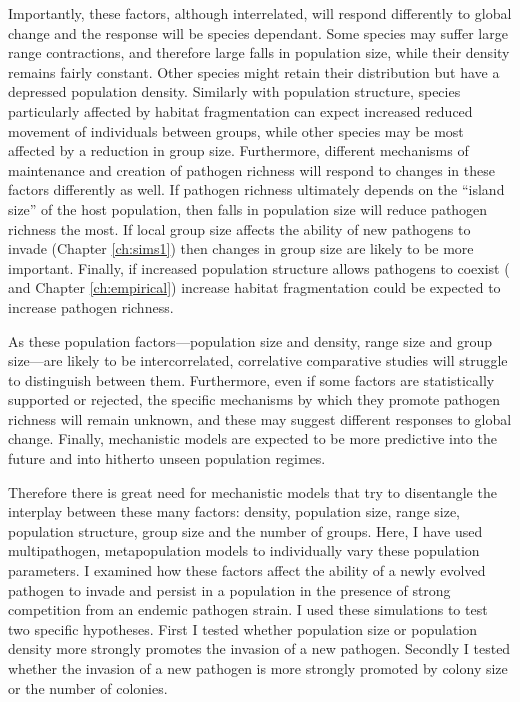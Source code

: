 
Importantly, these factors, although interrelated, will respond differently to global change and the response will be species dependant.
Some species may suffer large range contractions, and therefore large falls in population size, while their density remains fairly constant.
Other species might retain their distribution but have a depressed population density.
Similarly with population structure, species particularly affected by habitat fragmentation can expect increased reduced movement of individuals between groups, while other species may be most affected by a reduction in group size.
Furthermore, different mechanisms of maintenance and creation of pathogen richness will respond to changes in these factors differently as well.
If pathogen richness ultimately depends on the ``island size'' of the host population, then falls in population size will reduce pathogen richness the most.
If local group size affects the ability of new pathogens to invade (Chapter \ref{ch:sims1}) then changes in group size are likely to be more important.
Finally, if increased population structure allows pathogens to coexist (\parencite{qiu2013vector, allen2004sis, nunes2006localized} and Chapter \ref{ch:empirical}) increase habitat fragmentation could be expected to increase pathogen richness.

As these population factors---population size and density, range size and group size---are likely to be intercorrelated, correlative comparative studies will struggle to distinguish between them.
Furthermore, even if some factors are statistically supported or rejected, the specific mechanisms by which they promote pathogen richness will remain unknown, and these may suggest different responses to global change.
Finally, mechanistic models are expected to be more predictive into the future and into hitherto unseen population regimes.







Therefore there is great need for mechanistic models that try to disentangle the interplay between these many factors: density, population size, range size, population structure, group size and the number of groups.
Here, I have used multipathogen, metapopulation models to individually vary these population parameters.
I examined how these factors affect the ability of a newly evolved pathogen to invade and persist in a population in the presence of strong competition from an endemic pathogen strain.
I used these simulations to test two specific hypotheses.
First I tested whether population size or population density more strongly promotes the invasion of a new pathogen.
Secondly I tested whether the invasion of a new pathogen is more strongly promoted by colony size or the number of colonies.


